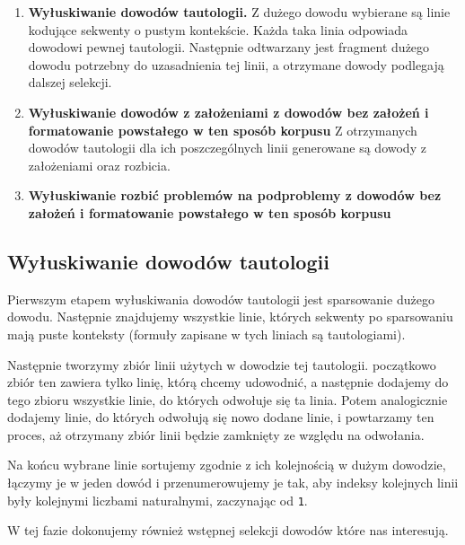 \documentclass[shortabstract]{iithesis}
\theoremstyle{definition}
\theoremstyle{remark}
\theoremstyle{plain}
\begin{document}
\begin{enumerate}[itemsep=0.4em, topsep=0.4em, parsep=0pt]
    \item \textbf{Wyłuskiwanie dowodów tautologii.}
    Z dużego dowodu wybierane są linie kodujące sekwenty o pustym kontekście.
    Każda taka linia odpowiada dowodowi pewnej tautologii. Następnie odtwarzany
    jest fragment dużego dowodu potrzebny do uzasadnienia tej linii, a otrzymane
    dowody podlegają dalszej selekcji.

    \item \textbf{Wyłuskiwanie dowodów z założeniami z dowodów bez założeń i formatowanie powstałego w ten sposób korpusu}
    Z otrzymanych dowodów tautologii dla ich poszczególnych linii generowane są dowody z założeniami oraz
    rozbicia.

    \item \textbf{Wyłuskiwanie rozbić problemów na podproblemy z dowodów bez założeń i formatowanie powstałego w ten sposób korpusu}
\end{enumerate}

\subsection{Wyłuskiwanie dowodów tautologii}

Pierwszym etapem wyłuskiwania dowodów tautologii jest sparsowanie dużego dowodu.
Następnie znajdujemy wszystkie linie, których sekwenty po sparsowaniu mają puste
konteksty (formuły zapisane w tych liniach są tautologiami). 

Następnie tworzymy zbiór linii użytych w dowodzie tej tautologii.
początkowo zbiór ten zawiera tylko linię, którą chcemy udowodnić, a następnie dodajemy do
tego zbioru wszystkie linie, do których odwołuje się ta linia. Potem analogicznie dodajemy linie,
do których odwołują się nowo dodane linie, i
powtarzamy ten proces, aż otrzymany zbiór linii będzie zamknięty ze względu na
odwołania. 

Na końcu wybrane linie sortujemy zgodnie z ich kolejnością w dużym dowodzie, 
łączymy je w jeden dowód i przenumerowujemy je tak, aby indeksy kolejnych linii 
były kolejnymi liczbami naturalnymi, zaczynając od \texttt{1}.

W tej fazie dokonujemy również wstępnej selekcji dowodów które nas interesują.
\end{document}
